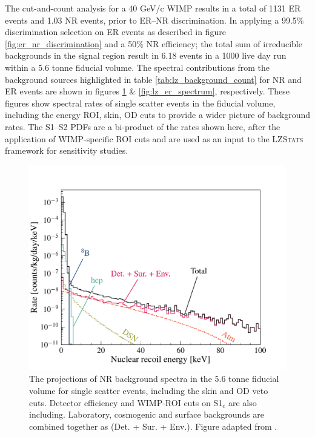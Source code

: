 The cut-and-count analysis for a 40 GeV/c\squared{} WIMP results in a total of 1131 ER events and 1.03 NR events, prior to ER--NR discrimination. In applying a 99.5\% discrimination selection on ER events as described in figure \ref{fig:er_nr_discrimination} and a 50\% NR efficiency; the total sum of irreducible backgrounds in the signal region result in 6.18 events in a 1000 live day run within a 5.6 tonne fiducial volume. The spectral contributions from the background sources highlighted in table \ref{tab:lz_background_count} for NR and ER events are shown in figures \ref{fig:lz_nr_spectrum} \& \ref{fig:lz_er_spectrum}, respectively. These figures show spectral rates of single scatter events in the fiducial volume, including the energy ROI, skin, OD cuts to provide a wider picture of background rates. The S1--S2 PDFs are a bi-product of the rates shown here, after the application of WIMP-specific ROI cuts and are used as an input to the \textsc{LZStats} framework for sensitivity studies.

%
\begin{figure}[h]
    \centering
    \includegraphics[scale=0.5]{Chapter_5/Figures/nr_background_spectrum.pdf}
    \caption[The projections of NR background spectra in the 5.6 tonne fiducial volume for single scatter events, including the skin and OD veto cuts.]%
    {The projections of NR background spectra in the 5.6 tonne fiducial volume for single scatter events, including the skin and OD veto cuts. Detector efficiency and WIMP-ROI cuts on S1$_{c}$ are also including. Laboratory, cosmogenic and surface backgrounds are combined together as (Det. + Sur. + Env.). Figure adapted from \cite{akerib2018projected}.}
    \label{fig:lz_nr_spectrum}
\end{figure}
%

